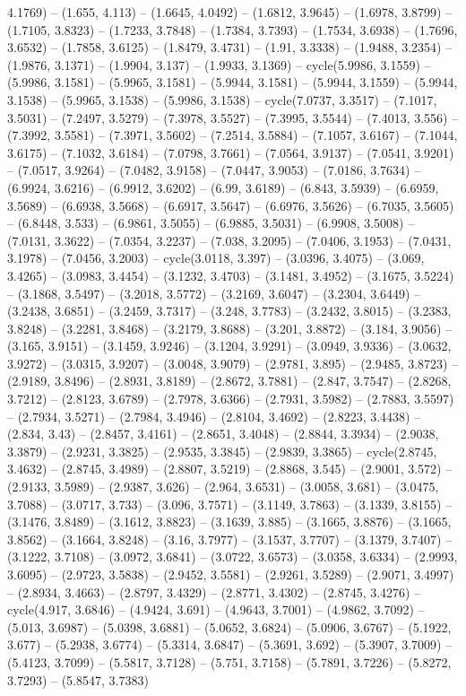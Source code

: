 4.1769) -- (1.655, 4.113) -- (1.6645, 4.0492) -- (1.6812, 3.9645) -- (1.6978, 3.8799) -- (1.7105, 3.8323) -- (1.7233, 3.7848) -- (1.7384, 3.7393) -- (1.7534, 3.6938) -- (1.7696, 3.6532) -- (1.7858, 3.6125) -- (1.8479, 3.4731) -- (1.91, 3.3338) -- (1.9488, 3.2354) -- (1.9876, 3.1371) -- (1.9904, 3.137) -- (1.9933, 3.1369) -- cycle(5.9986, 3.1559) -- (5.9986, 3.1581) -- (5.9965, 3.1581) -- (5.9944, 3.1581) -- (5.9944, 3.1559) -- (5.9944, 3.1538) -- (5.9965, 3.1538) -- (5.9986, 3.1538) -- cycle(7.0737, 3.3517) -- (7.1017, 3.5031) -- (7.2497, 3.5279) -- (7.3978, 3.5527) -- (7.3995, 3.5544) -- (7.4013, 3.556) -- (7.3992, 3.5581) -- (7.3971, 3.5602) -- (7.2514, 3.5884) -- (7.1057, 3.6167) -- (7.1044, 3.6175) -- (7.1032, 3.6184) -- (7.0798, 3.7661) -- (7.0564, 3.9137) -- (7.0541, 3.9201) -- (7.0517, 3.9264) -- (7.0482, 3.9158) -- (7.0447, 3.9053) -- (7.0186, 3.7634) -- (6.9924, 3.6216) -- (6.9912, 3.6202) -- (6.99, 3.6189) -- (6.843, 3.5939) -- (6.6959, 3.5689) -- (6.6938, 3.5668) -- (6.6917, 3.5647) -- (6.6976, 3.5626) -- (6.7035, 3.5605) -- (6.8448, 3.533) -- (6.9861, 3.5055) -- (6.9885, 3.5031) -- (6.9908, 3.5008) -- (7.0131, 3.3622) -- (7.0354, 3.2237) -- (7.038, 3.2095) -- (7.0406, 3.1953) -- (7.0431, 3.1978) -- (7.0456, 3.2003) -- cycle(3.0118, 3.397) -- (3.0396, 3.4075) -- (3.069, 3.4265) -- (3.0983, 3.4454) -- (3.1232, 3.4703) -- (3.1481, 3.4952) -- (3.1675, 3.5224) -- (3.1868, 3.5497) -- (3.2018, 3.5772) -- (3.2169, 3.6047) -- (3.2304, 3.6449) -- (3.2438, 3.6851) -- (3.2459, 3.7317) -- (3.248, 3.7783) -- (3.2432, 3.8015) -- (3.2383, 3.8248) -- (3.2281, 3.8468) -- (3.2179, 3.8688) -- (3.201, 3.8872) -- (3.184, 3.9056) -- (3.165, 3.9151) -- (3.1459, 3.9246) -- (3.1204, 3.9291) -- (3.0949, 3.9336) -- (3.0632, 3.9272) -- (3.0315, 3.9207) -- (3.0048, 3.9079) -- (2.9781, 3.895) -- (2.9485, 3.8723) -- (2.9189, 3.8496) -- (2.8931, 3.8189) -- (2.8672, 3.7881) -- (2.847, 3.7547) -- (2.8268, 3.7212) -- (2.8123, 3.6789) -- (2.7978, 3.6366) -- (2.7931, 3.5982) -- (2.7883, 3.5597) -- (2.7934, 3.5271) -- (2.7984, 3.4946) -- (2.8104, 3.4692) -- (2.8223, 3.4438) -- (2.834, 3.43) -- (2.8457, 3.4161) -- (2.8651, 3.4048) -- (2.8844, 3.3934) -- (2.9038, 3.3879) -- (2.9231, 3.3825) -- (2.9535, 3.3845) -- (2.9839, 3.3865) -- cycle(2.8745, 3.4632) -- (2.8745, 3.4989) -- (2.8807, 3.5219) -- (2.8868, 3.545) -- (2.9001, 3.572) -- (2.9133, 3.5989) -- (2.9387, 3.626) -- (2.964, 3.6531) -- (3.0058, 3.681) -- (3.0475, 3.7088) -- (3.0717, 3.733) -- (3.096, 3.7571) -- (3.1149, 3.7863) -- (3.1339, 3.8155) -- (3.1476, 3.8489) -- (3.1612, 3.8823) -- (3.1639, 3.885) -- (3.1665, 3.8876) -- (3.1665, 3.8562) -- (3.1664, 3.8248) -- (3.16, 3.7977) -- (3.1537, 3.7707) -- (3.1379, 3.7407) -- (3.1222, 3.7108) -- (3.0972, 3.6841) -- (3.0722, 3.6573) -- (3.0358, 3.6334) -- (2.9993, 3.6095) -- (2.9723, 3.5838) -- (2.9452, 3.5581) -- (2.9261, 3.5289) -- (2.9071, 3.4997) -- (2.8934, 3.4663) -- (2.8797, 3.4329) -- (2.8771, 3.4302) -- (2.8745, 3.4276) -- cycle(4.917, 3.6846) -- (4.9424, 3.691) -- (4.9643, 3.7001) -- (4.9862, 3.7092) -- (5.013, 3.6987) -- (5.0398, 3.6881) -- (5.0652, 3.6824) -- (5.0906, 3.6767) -- (5.1922, 3.677) -- (5.2938, 3.6774) -- (5.3314, 3.6847) -- (5.3691, 3.692) -- (5.3907, 3.7009) -- (5.4123, 3.7099) -- (5.5817, 3.7128) -- (5.751, 3.7158) -- (5.7891, 3.7226) -- (5.8272, 3.7293) -- (5.8547, 3.7383) 